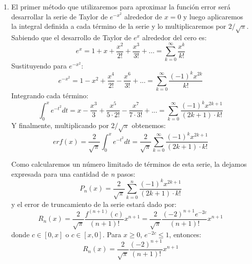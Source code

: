 \documentclass[titlepage,a4paper]{article}
\begin{document}
	\begin{enumerate}[label=(\alph*)]
		\item 
			El primer método que utilizaremos para aproximar la función error\cite{error_function} será desarrollar la serie de Taylor 
			de $e^{-x^2}$ alrededor de $x=0$ y luego aplicaremos la integral definida a cada término de la serie y 
			lo multiplicaremos por $2/\sqrt{\pi}$.\\
			Sabiendo que el desarrollo de Taylor de $e^x$ alrededor del cero es:
				\begin{equation}
					e^x = 1 + x + \frac{x^2}{2!} + \frac{x^3}{3!} + ... = \sum_{k=0}^{\infty}\frac{x^k}{k!}\label{eq:3}
				\end{equation}
			Sustituyendo para $e^{-x^2}$:
				\begin{equation}
					e^{-x^2} = 1 - x^2 + \frac{x^4}{2!} - \frac{x^6}{3!} + ... = \sum_{k=0}^{\infty}\frac{(-1)^k x^{2k}}{k!}
				\end{equation}
			Integrando cada término:
				\begin{equation}
					\int_{0}^{x}e^{-t^2}dt= x - \frac{x^3}{3} + \frac{x^5}{5\cdot2!} - \frac{x^7}{7\cdot3!} + ... = \sum_{k=0}^{\infty}\frac{(-1)^k x^{2k+1}}{(2k+1)\cdot k!}
				\end{equation}
			Y finalmente, multiplicando por $2/\sqrt{\pi}$ obtenemos:
				\begin{equation}
					erf(x) = \frac{2}{\sqrt{\pi}}\int_{0}^{x}e^{-t^2}dt = \frac{2}{\sqrt{\pi}}\sum_{k=0}^{\infty}\frac{(-1)^k x^{2k+1}}{(2k+1)\cdot k!}
				\end{equation}

			Como calcularemos un número limitado de términos de esta serie, la dejamos expresada para una cantidad de \emph{n} pasos:
				\begin{equation}
					P_{n}(x) = \frac{2}{\sqrt{\pi}}\sum_{k=0}^{n}\frac{(-1)^k x^{2k+1}}{(2k+1)\cdot k!}
				\end{equation}
			y el error de truncamiento de la serie estará dado por:
				\begin{equation}
					R_{n}(x) = \frac{2}{\sqrt{\pi}}\frac{f^{(n+1)}(c)}{(n+1)!}x^{n+1}=\frac{2}{\sqrt{\pi}}\frac{(-2)^{n+1}e^{-2c}}{(n+1)!}x^{n+1}
				\end{equation}
			donde $c \in [0, x]$ o $c \in [x, 0]$. Para $x\geq0$, $e^{-2c}\leq1$, entonces:
				\begin{equation}
					R_{n}(x) = \frac{2}{\sqrt{\pi}}\frac{(-2)^{n+1}}{(n+1)!}x^{n+1}
				\end{equation}


\end{enumerate}
\end{document}
